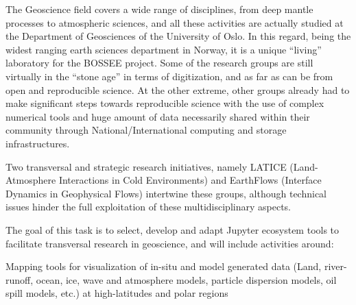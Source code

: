\begin{task}[
  title=Geosciences application,
  id=geoscience,
  lead=UIO,
  PM=24,
  wphases={0-48},
  partners={QS,SRL}
]



The Geoscience field covers a wide range of disciplines, from deep
mantle processes to atmospheric sciences, and all these activities are
actually studied at the Department of Geosciences of the University of
Oslo. In this regard, being the widest ranging earth sciences
department in Norway, it is a unique “living” laboratory for the
BOSSEE project. Some of the research groups are still virtually in the
“stone age” in terms of digitization, and as far as can be from open
and reproducible science. At the other extreme, other groups already
had to make significant steps towards reproducible science with the
use of complex numerical tools and huge amount of data necessarily
shared within their community through National/International computing
and storage infrastructures.

Two transversal and strategic research initiatives, namely LATICE
(Land-Atmosphere Interactions in Cold Environments) and EarthFlows
(Interface Dynamics in Geophysical Flows) intertwine these groups,
although technical issues hinder the full exploitation of these
multidisciplinary aspects.

The goal of this task is to select, develop and adapt Jupyter
ecosystem tools to facilitate transversal research in geoscience, and
will include activities around:

  \begin{compactitem}
  \item Mapping tools for visualization of in-situ and model generated
    data (Land, river-runoff, ocean, ice, wave and atmosphere models,
    particle dispersion models, oil spill models, etc.)  at
    high-latitudes and polar regions


\end{compactitem}
\end{task}
